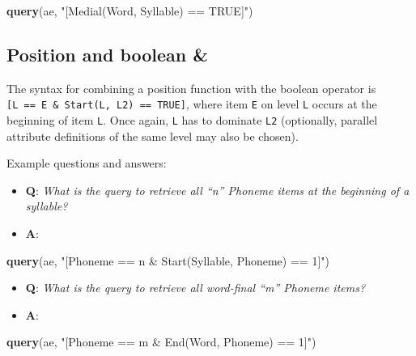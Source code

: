 \documentclass[]{book}
\newenvironment{Shaded}{\begin{snugshade}}{\end{snugshade}}
\newcommand{\KeywordTok}[1]{\textcolor[rgb]{0.13,0.29,0.53}{\textbf{#1}}}
\newcommand{\NormalTok}[1]{#1}
\newcommand{\StringTok}[1]{\textcolor[rgb]{0.31,0.60,0.02}{#1}}
\providecommand{\tightlist}{%
  \setlength{\itemsep}{0pt}\setlength{\parskip}{0pt}}
\theoremstyle{definition}
\theoremstyle{definition}
\theoremstyle{definition}
\theoremstyle{remark}
\begin{document}
\begin{Shaded}
\begin{Highlighting}[]
\KeywordTok{query}\NormalTok{(ae, }\StringTok{"[Medial(Word, Syllable) == TRUE]"}\NormalTok{)}
\end{Highlighting}
\end{Shaded}

\hypertarget{position-and-boolean}{%
\subsection{Position and boolean \&}\label{position-and-boolean}}

The syntax for combining a position function with the boolean operator
is \texttt{{[}L\ ==\ E\ \&\ Start(L,\ L2)\ ==\ TRUE{]}}, where item
\texttt{E} on level \texttt{L} occurs at the beginning of item
\texttt{L}. Once again, \texttt{L} has to dominate \texttt{L2}
(optionally, parallel attribute definitions of the same level may also
be chosen).

Example questions and answers:

\begin{itemize}
\tightlist
\item
  \textbf{Q}: \emph{What is the query to retrieve all ``n'' Phoneme
  items at the beginning of a syllable?}
\item
  \textbf{A}:
\end{itemize}

\begin{Shaded}
\begin{Highlighting}[]
\KeywordTok{query}\NormalTok{(ae, }\StringTok{"[Phoneme == n & Start(Syllable, Phoneme) == 1]"}\NormalTok{)}
\end{Highlighting}
\end{Shaded}

\begin{itemize}
\tightlist
\item
  \textbf{Q}: \emph{What is the query to retrieve all word-final ``m''
  Phoneme items?}
\item
  \textbf{A}:
\end{itemize}

\begin{Shaded}
\begin{Highlighting}[]
\KeywordTok{query}\NormalTok{(ae, }\StringTok{"[Phoneme == m & End(Word, Phoneme) == 1]"}\NormalTok{)}
\end{Highlighting}
\end{Shaded}
\end{document}
